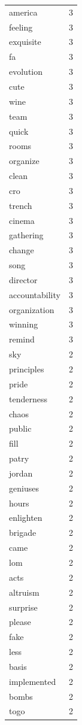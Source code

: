 \begin{tabular}{lr}
america & 3 \\
feeling & 3 \\
exquisite & 3 \\
fa & 3 \\
evolution & 3 \\
cute & 3 \\
wine & 3 \\
team & 3 \\
quick & 3 \\
rooms & 3 \\
organize & 3 \\
clean & 3 \\
cro & 3 \\
trench & 3 \\
cinema & 3 \\
gathering & 3 \\
change & 3 \\
song & 3 \\
director & 3 \\
accountability & 3 \\
organization & 3 \\
winning & 3 \\
remind & 3 \\
sky & 2 \\
principles & 2 \\
pride & 2 \\
tenderness & 2 \\
chaos & 2 \\
public & 2 \\
fill & 2 \\
patry & 2 \\
jordan & 2 \\
geniuses & 2 \\
hours & 2 \\
enlighten & 2 \\
brigade & 2 \\
came & 2 \\
lom & 2 \\
acts & 2 \\
altruism & 2 \\
surprise & 2 \\
please & 2 \\
fake & 2 \\
less & 2 \\
basis & 2 \\
implemented & 2 \\
bombs & 2 \\
togo & 2 \\

\end{tabular}
